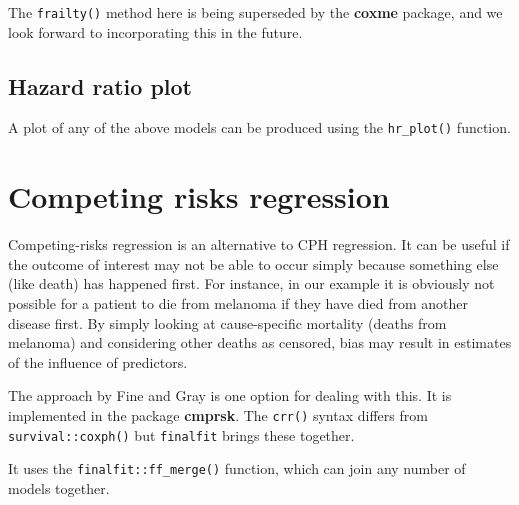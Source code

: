 \documentclass[
  12pt,
  krantz2]{krantz}
\makeatletter
\newenvironment{Shaded}{\begin{snugshade}}{\end{snugshade}}
\newcommand{\KeywordTok}[1]{\textcolor[rgb]{0.13,0.29,0.53}{\textbf{#1}}}
\newcommand{\NormalTok}[1]{#1}
\newcommand{\OperatorTok}[1]{\textcolor[rgb]{0.81,0.36,0.00}{\textbf{#1}}}
\newcommand{\StringTok}[1]{\textcolor[rgb]{0.31,0.60,0.02}{#1}}
\newenvironment{kframe}{%
\medskip{}
\setlength{\fboxsep}{.8em}
 \def\at@end@of@kframe{}%
 \ifinner\ifhmode%
  \def\at@end@of@kframe{\end{minipage}}%
  \begin{minipage}{\columnwidth}%
 \fi\fi%
 \def\FrameCommand##1{\hskip\@totalleftmargin \hskip-\fboxsep
 \colorbox{shadecolor}{##1}\hskip-\fboxsep
     \hskip-\linewidth \hskip-\@totalleftmargin \hskip\columnwidth}%
 \MakeFramed {\advance\hsize-\width
   \@totalleftmargin\z@ \linewidth\hsize
   \@setminipage}}%
 {\par\unskip\endMakeFramed%
 \at@end@of@kframe}
\renewenvironment{Shaded}{\begin{kframe}}{\end{kframe}}
\makeatother
\begin{document}
The \texttt{frailty()} method here is being superseded by the \textbf{coxme} package, and we look forward to incorporating this in the future.

\hypertarget{hazard-ratio-plot}{%
\subsection{Hazard ratio plot}\label{hazard-ratio-plot}}


A plot of any of the above models can be produced using the \texttt{hr\_plot()} function.

\begin{Shaded}
\end{Shaded}

\hypertarget{competing-risks-regression}{%
\section{Competing risks regression}\label{competing-risks-regression}}


Competing-risks regression is an alternative to CPH regression.
It can be useful if the outcome of interest may not be able to occur simply because something else (like death) has happened first.
For instance, in our example it is obviously not possible for a patient to die from melanoma if they have died from another disease first.
By simply looking at cause-specific mortality (deaths from melanoma) and considering other deaths as censored, bias may result in estimates of the influence of predictors.

The approach by Fine and Gray is one option for dealing with this.
It is implemented in the package \textbf{cmprsk}.
The \texttt{crr()} syntax differs from \texttt{survival::coxph()} but \texttt{finalfit} brings these together.

It uses the \texttt{finalfit::ff\_merge()} function, which can join any number of models together.
\end{document}
